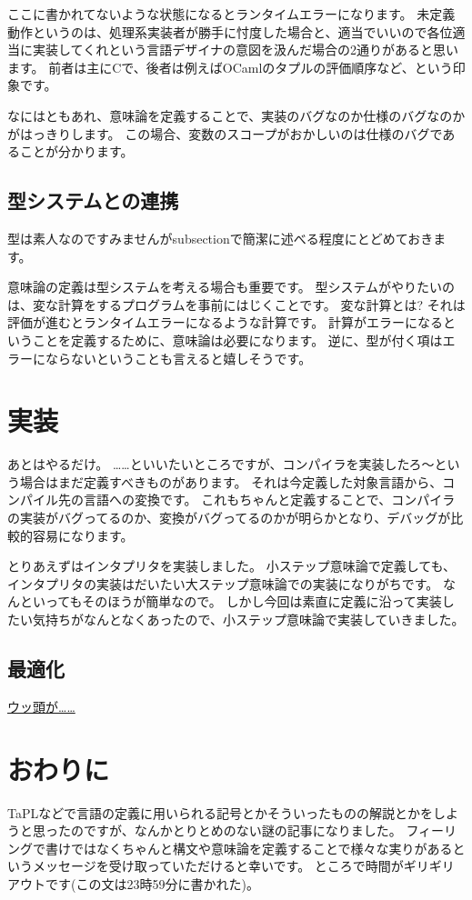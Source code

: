 \documentclass{ltjsarticle}
\begin{document}
ここに書かれてないような状態になるとランタイムエラーになります。
未定義動作というのは、処理系実装者が勝手に忖度した場合と、適当でいいので各位適当に実装してくれという言語デザイナの意図を汲んだ場合の2通りがあると思います。
前者は主にCで、後者は例えばOCamlのタプルの評価順序など、という印象です。

なにはともあれ、意味論を定義することで、実装のバグなのか仕様のバグなのかがはっきりします。
この場合、変数のスコープがおかしいのは仕様のバグであることが分かります。

\subsection{型システムとの連携}
型は素人なのですみませんがsubsectionで簡潔に述べる程度にとどめておきます。

意味論の定義は型システムを考える場合も重要です。
型システムがやりたいのは、変な計算をするプログラムを事前にはじくことです。
変な計算とは?
それは評価が進むとランタイムエラーになるような計算です。
計算がエラーになるということを定義するために、意味論は必要になります。
逆に、型が付く項はエラーにならないということも言えると嬉しそうです。

\section{実装}
あとはやるだけ。
……といいたいところですが、コンパイラを実装したろ〜という場合はまだ定義すべきものがあります。
それは今定義した対象言語から、コンパイル先の言語への変換です。
これもちゃんと定義することで、コンパイラの実装がバグってるのか、変換がバグってるのかが明らかとなり、デバッグが比較的容易になります。

とりあえず\lambdaeff{}はインタプリタを実装しました。
小ステップ意味論で定義しても、インタプリタの実装はだいたい大ステップ意味論での実装になりがちです。
なんといってもそのほうが簡単なので。
しかし今回は素直に定義に沿って実装したい気持ちがなんとなくあったので、小ステップ意味論で実装していきました。

\subsection{最適化}
\href{https://nymphium.github.io/2018/01/31/%E3%82%B3%E3%83%B3%E3%83%91%E3%82%A4%E3%83%A9%E4%B8%AD%E9%96%93%E8%A8%80%E8%AA%9E%E3%81%8A%E3%82%88%E3%81%B3%E3%81%9D%E3%81%AE%E6%9C%80%E9%81%A9%E5%8C%96%E3%81%AE%E5%AE%9F%E8%A3%85.html}{ウッ頭が……}

\section{おわりに}
TaPLなどで言語の定義に用いられる記号とかそういったものの解説とかをしようと思ったのですが、なんかとりとめのない謎の記事になりました。
フィーリングで書けではなくちゃんと構文や意味論を定義することで様々な実りがあるというメッセージを受け取っていただけると幸いです。
ところで時間がギリギリアウトです(この文は23時59分に書かれた)。
\end{document}
